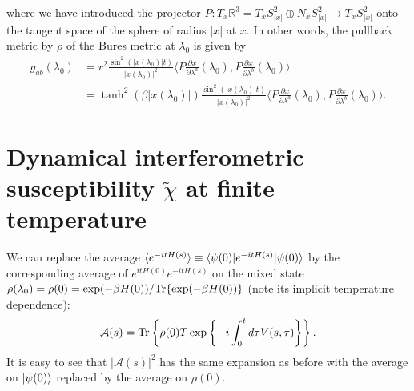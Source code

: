 where we have introduced the projector $P:T_{x}\mathbb{R}^3=T_{x}S^{2}_{|x|}\oplus N_{x}S^{2}_{|x|}\to T_{x}S^{2}_{|x|}$ onto the tangent space of the sphere of radius $|x|$ at $x$. In other words, the pullback metric by $\rho$ of the Bures metric at $\lambda_0$ is given by
\begin{eqnarray*}
g_{ab}(\lambda_0)&=r^2\frac{\sin^2(|x(\lambda_0)|t)}{|x(\lambda_0)|^2}\langle P \frac{\partial x}{\partial \lambda^a}(\lambda_0),P\frac{\partial x}{\partial \lambda^b}(\lambda_0)\rangle\\
&=\tanh^2(\beta |x(\lambda_0)|)\frac{\sin^2(|x(\lambda_0)|t)}{|x(\lambda_0)|^2}\langle P \frac{\partial x}{\partial \lambda^a}(\lambda_0),P\frac{\partial x}{\partial \lambda^b}(\lambda_0)\rangle.
\end{eqnarray*}

%
\section*{Dynamical interferometric susceptibility $\tilde{\chi}$ at finite temperature}

We can replace the average $\langle e^{-itH(s)}\rangle\equiv \langle \psi(0) |e^{-itH(s)}| \psi(0) \rangle$ by the corresponding average of $e^{itH(0)}e^{-itH(s)}$ on the mixed state $\rho(\lambda_0)=\rho(0)=\exp(-\beta H(0))/\text{Tr}\{\exp(-\beta H(0))\}$ (note its implicit temperature dependence):
\begin{equation*}
\mathcal{A}(s)=\text{Tr}\left\{\rho(0)T\exp\left\{-i\int_{0}^{t} d\tau V(s,\tau)\right\}\right\}.
\end{equation*}
It is easy to see that $|\mathcal{A}(s)|^2$ has the same expansion as before with the average on $| \psi(0) \rangle$ replaced by the average on $\rho(0)$.

